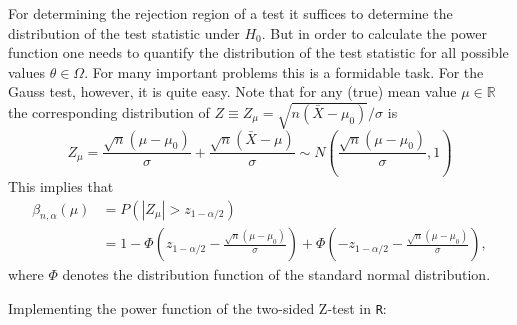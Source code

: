 \documentclass[
]{book}
\begin{document}
For determining the rejection region of a test it suffices to determine the distribution of the test statistic under \(H_0\). But in order to calculate the power function one needs to quantify the distribution of the test statistic for all possible values \(\theta\in\Omega\). For many important problems this is a formidable task. For the Gauss test, however, it is quite easy. Note that for any (true) mean value \(\mu\in\mathbb{R}\) the corresponding distribution of \(Z\equiv Z_\mu=\sqrt{n(\bar X-\mu_0)}/\sigma\) is
\[Z_\mu=\frac{\sqrt{n} (\mu -\mu_0)}{\sigma}+\frac{\sqrt{n} (\bar X -\mu)}{\sigma}
\sim N\left(\frac{\sqrt{n} (\mu -\mu_0)}{\sigma}, 1\right)\]
This implies that
\begin{align*}
\beta_{n,\alpha}(\mu)
& = P\left(|Z_\mu|>z_{1-\alpha/2}\right)\\
& = 1-\Phi\left(z_{1-\alpha/2}-\frac{\sqrt{n} (\mu -\mu_0)}{\sigma}\right) + \Phi\left(-z_{1-\alpha/2}-\frac{\sqrt{n} (\mu -\mu_0)}{\sigma}\right),
\end{align*}
where \(\Phi\) denotes the distribution function of the standard normal distribution.

Implementing the power function of the two-sided Z-test in \texttt{R}:
\end{document}
